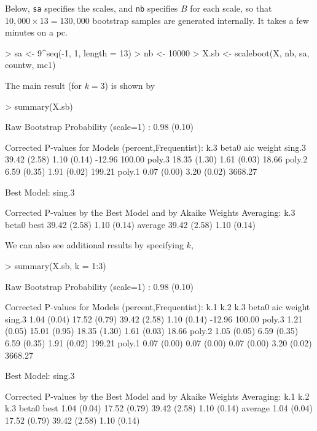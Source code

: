 \documentclass[a4paper]{amsart}
\begin{document}
Below, {\tt sa} specifies the scales, and {\tt nb} specifies
$B$ for each scale, so that $10,000\times13=130,000$ bootstrap samples
are generated internally.  It takes a few minutes on a pc.
\begin{Schunk}
\begin{Sinput}
> sa <- 9^seq(-1, 1, length = 13)
> nb <- 10000
> X.sb <- scaleboot(X, nb, sa, countw, mc1)
\end{Sinput}
\end{Schunk}
The main result (for $k=3$) is shown by
\begin{Schunk}
\begin{Sinput}
> summary(X.sb)
\end{Sinput}
\begin{Soutput}
Raw Bootstrap Probability (scale=1) : 0.98 (0.10)

Corrected P-values for Models (percent,Frequentist):
       k.3          beta0       aic     weight 
sing.3 39.42 (2.58) 1.10 (0.14)  -12.96 100.00 
poly.3 18.35 (1.30) 1.61 (0.03)   18.66        
poly.2  6.59 (0.35) 1.91 (0.02)  199.21        
poly.1  0.07 (0.00) 3.20 (0.02) 3668.27        

Best Model:  sing.3 

Corrected P-values by the Best Model and by Akaike Weights Averaging:
        k.3          beta0       
best    39.42 (2.58) 1.10 (0.14) 
average 39.42 (2.58) 1.10 (0.14) 
\end{Soutput}
\end{Schunk}
We can also see additional results by specifying $k$,
\begin{Schunk}
\begin{Sinput}
> summary(X.sb, k = 1:3)
\end{Sinput}
\begin{Soutput}
Raw Bootstrap Probability (scale=1) : 0.98 (0.10)

Corrected P-values for Models (percent,Frequentist):
       k.1         k.2          k.3          beta0       aic     weight 
sing.3 1.04 (0.04) 17.52 (0.79) 39.42 (2.58) 1.10 (0.14)  -12.96 100.00 
poly.3 1.21 (0.05) 15.01 (0.95) 18.35 (1.30) 1.61 (0.03)   18.66        
poly.2 1.05 (0.05)  6.59 (0.35)  6.59 (0.35) 1.91 (0.02)  199.21        
poly.1 0.07 (0.00)  0.07 (0.00)  0.07 (0.00) 3.20 (0.02) 3668.27        

Best Model:  sing.3 

Corrected P-values by the Best Model and by Akaike Weights Averaging:
        k.1         k.2          k.3          beta0       
best    1.04 (0.04) 17.52 (0.79) 39.42 (2.58) 1.10 (0.14) 
average 1.04 (0.04) 17.52 (0.79) 39.42 (2.58) 1.10 (0.14) 
\end{Soutput}
\end{Schunk}
\end{document}
